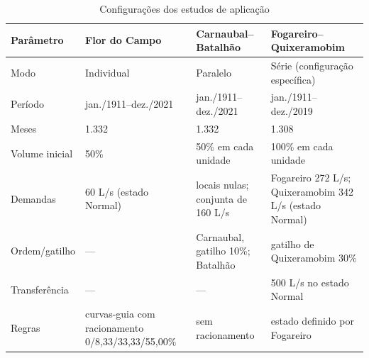 \begin{table}[!htbp]
    \captionsetup{width=15cm}
    \caption{Configurações dos estudos de aplicação}
    \label{tab:config-aplicacoes}
    \centering
    \footnotesize
    \begin{tabular}{p{3.0cm}p{3.6cm}p{3.6cm}p{3.8cm}}
        \toprule
        Parâmetro & Flor do Campo & Carnaubal--Batalhão & Fogareiro--Quixeramobim \\
        \midrule
        Modo & Individual & Paralelo & Série (configuração específica) \\
        Período & jan./1911--dez./2021 & jan./1911--dez./2021 & jan./1911--dez./2019 \\
        Meses & 1.332 & 1.332 & 1.308 \\
        Volume inicial & 50\% & 50\% em cada unidade & 100\% em cada unidade \\
        Demandas & 60 L/s (estado Normal) & locais nulas; conjunta de 160 L/s & Fogareiro 272 L/s; Quixeramobim 342 L/s (estado Normal) \\
        Ordem/gatilho & --- & Carnaubal, gatilho 10\%; Batalhão & gatilho de Quixeramobim 30\% \\
        Transferência & --- & --- & 500 L/s no estado Normal \\
        Regras & curvas-guia com racionamento 0/8,33/33,33/55,00\% & sem racionamento & estado definido por Fogareiro \\
        \bottomrule
    \end{tabular}
\end{table}

